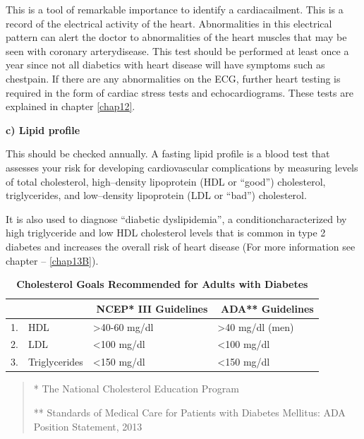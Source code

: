 This is a tool of remarkable importance to identify a cardiac\break ailment. This is a record of the electrical activity of the heart. Ab\-normalities in this electrical pattern can alert the doctor to abnorma\-lities of the heart muscles that may be seen with coronary artery\break disease. This test should be performed at least once a year since not all diabetics with heart disease will have symptoms such as chest\break pain. If there are any abnormalities on the ECG, further heart testing is required in the form of cardiac stress tests and echocardiograms. These tests are explained in chapter \ref{chap12}.

\noindent\textbf{c) Lipid profile}

This should be checked annually. A fasting lipid profile is a blood test that assesses your risk for developing cardiovascular complications by measuring levels of total cholesterol, high–density lipoprotein (HDL or “good”) cholesterol, triglycerides, and low–density lipoprotein (LDL or “bad”) cholesterol.

It is also used to diagnose “diabetic dyslipidemia”, a condition\break characterized by high triglyceride and low HDL cholesterol levels that is common in type 2 diabetes and increases the overall risk of heart disease (For more information see chapter – \ref{chap13B}).

{
\begin{table}[H]
\centering
\caption*{\textbf{Cholesterol Goals Recommended for Adults with Diabetes}}
\small\addtolength{\tabcolsep}{-3pt}
\begin{tabular}{|c|l|l|l|}
\hline
 & & \,\,\textbf{NCEP* III Guidelines} & \,\,\textbf{ADA** Guidelines}\\
\hline
1. & HDL & \textgreater 40-60 mg/dl & \textgreater 40 mg/dl (men)\\
\hline
2. & LDL & \textless 100 mg/dl & \textless 100 mg/dl\\
\hline
3. & Triglycerides & \textless 150 mg/dl & \textless 150 mg/dl\\
\hline
\end{tabular}
\end{table}
\begin{quote}
* The National Cholesterol Education Program

** Standards of Medical Care for Patients with Diabetes Mellitus: ADA
Position Statement, 2013
\end{quote}
}\relax

